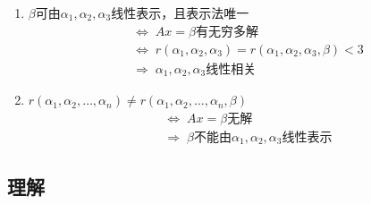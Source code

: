 \documentclass[./linear_algebra.tex]{subfiles}
\begin{document}
\begin{enumerate}
\begin{enumerate}
        \end{enumerate}
        \item $\beta$可由$\alpha_1, \alpha_2, \alpha_3$线性表示，且表示法{\color{red}{不}}唯一
        \begin{align*}
            &\Leftrightarrow\; Ax = \beta\text{有无穷多解} \\
            &\Leftrightarrow\; r(\alpha_1, \alpha_2, \alpha_3) = r(\alpha_1, \alpha_2, \alpha_3, \beta) < 3 \\
            &\Rightarrow\; \alpha_1, \alpha_2, \alpha_3\text{线性相关}
        \end{align*}
        \item $r(\alpha_1, \alpha_2, \dots, \alpha_n) \neq r(\alpha_1, \alpha_2, \dots, \alpha_n, \beta)$
        \begin{align*}
            &\Leftrightarrow\; Ax = \beta\text{无解} \\
            &\Rightarrow\; \beta\text{不能由}\alpha_1, \alpha_2, \alpha_3\text{线性表示}
        \end{align*}
    \end{enumerate}

    \subsection{理解}
\end{document}
